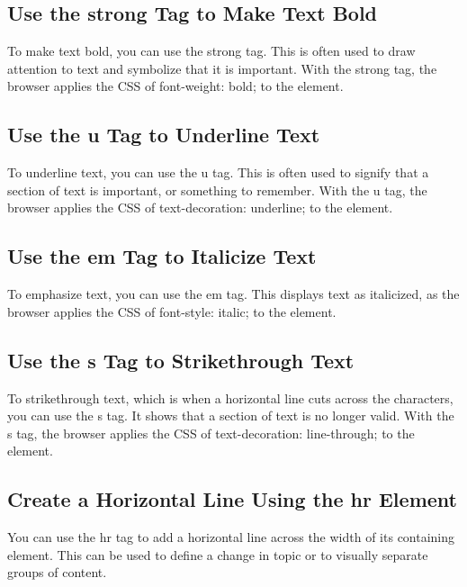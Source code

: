 \documentclass{article}%
\begin{document}
%
\subsection{Use the strong Tag to Make Text Bold}%
\label{subsec:UsethestrongTagtoMakeTextBold}%
To make text bold, you can use the strong tag. This is often used to draw attention to text and symbolize that it is important. With the strong tag, the browser applies the CSS of font{-}weight: bold; to the element.\newline%

%
\subsection{Use the u Tag to Underline Text}%
\label{subsec:UsetheuTagtoUnderlineText}%
To underline text, you can use the u tag. This is often used to signify that a section of text is important, or something to remember. With the u tag, the browser applies the CSS of text{-}decoration: underline; to the element.\newline%

%
\subsection{Use the em Tag to Italicize Text}%
\label{subsec:UsetheemTagtoItalicizeText}%
To emphasize text, you can use the em tag. This displays text as italicized, as the browser applies the CSS of font{-}style: italic; to the element.\newline%

%
\subsection{Use the s Tag to Strikethrough Text}%
\label{subsec:UsethesTagtoStrikethroughText}%
To strikethrough text, which is when a horizontal line cuts across the characters, you can use the s tag. It shows that a section of text is no longer valid. With the s tag, the browser applies the CSS of text{-}decoration: line{-}through; to the element.\newline%

%
\subsection{Create a Horizontal Line Using the hr Element}%
\label{subsec:CreateaHorizontalLineUsingthehrElement}%
You can use the hr tag to add a horizontal line across the width of its containing element. This can be used to define a change in topic or to visually separate groups of content.\newline%
\end{document}
